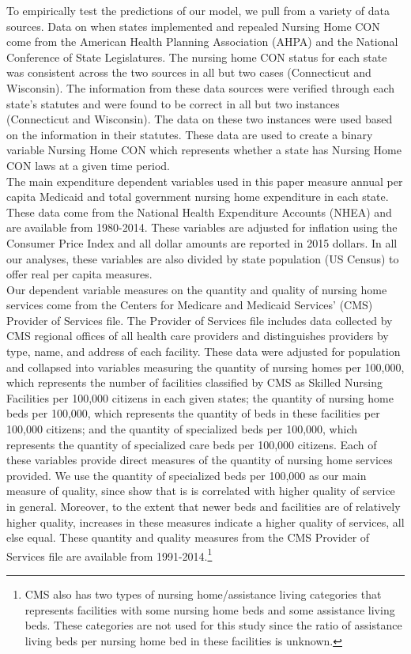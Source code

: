\documentclass[../Main.tex]{subfiles}
\begin{document}
To empirically test the predictions of our model, we pull from a variety of data sources. Data on when states implemented and repealed Nursing Home CON come from the American Health Planning Association (AHPA) and the National Conference of State Legislatures. The nursing home CON status for each state was consistent across the two sources in all but two cases (Connecticut and Wisconsin). The information from these data sources were verified through each state’s statutes and were found to be correct in all but two instances (Connecticut and Wisconsin). The data on these two instances were used based on the information in their statutes. These data are used to create a binary variable Nursing Home CON which represents whether a state has Nursing Home CON laws at a given time period.\\
\indent The main expenditure dependent variables used in this paper measure annual per capita Medicaid and total government nursing home expenditure in each state. These data come from the National Health Expenditure Accounts (NHEA) and are available from 1980-2014. These variables are adjusted for inflation using the Consumer Price Index and all dollar amounts are reported in 2015 dollars. In all our analyses, these variables are also divided by state population (US Census) to offer real per capita measures.\\
\indent Our dependent variable measures on the quantity and quality of nursing home services come from the Centers for Medicare and Medicaid Services’ (CMS) Provider of Services file. The Provider of Services file includes data collected by CMS regional offices of all health care providers and distinguishes providers by type, name, and address of each facility. These data were adjusted for population and collapsed into variables measuring the quantity of nursing homes per 100,000, which represents the number of facilities classified by CMS as Skilled Nursing Facilities per 100,000 citizens in each given states; the quantity of nursing home beds per 100,000, which represents the quantity of beds in these facilities per 100,000 citizens; and the quantity of specialized beds per 100,000, which represents the quantity of specialized care beds per 100,000 citizens. Each of these variables provide direct measures of the quantity of nursing home services provided. We use the quantity of specialized beds per 100,000 as our main measure of quality, since \citet{grabowski2010quality} show that is is correlated with higher quality of service in general. Moreover, to the extent that newer beds and facilities are of relatively higher quality, increases in these measures indicate a higher quality of services, all else equal. These quantity and quality measures from the CMS Provider of Services file are available from 1991-2014.\footnote{CMS also has two types of nursing home/assistance living categories that represents facilities with some nursing home beds and some assistance living beds. These categories are not used for this study since the ratio of assistance living beds per nursing home bed in these facilities is unknown.} \\
\end{document}
